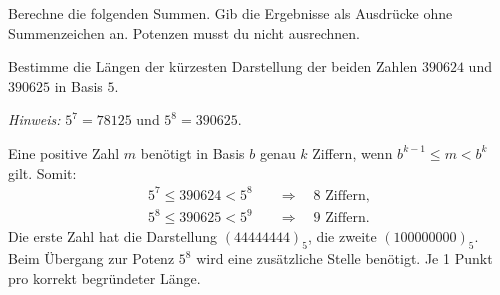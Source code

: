 \begin{questions}
	\question
	Berechne die folgenden Summen. Gib die Ergebnisse als Ausdrücke ohne Summenzeichen an. Potenzen musst du nicht ausrechnen.


	\question[2]
	Bestimme die Längen der kürzesten Darstellung der beiden Zahlen $390624$ und $390625$ in Basis $5$.

	\textit{Hinweis:} $5^7=78125$ und $5^8=390625$.
	\begin{solution}
		Eine positive Zahl $m$ benötigt in Basis $b$ genau $k$ Ziffern, wenn $b^{k-1}\leq m<b^k$ gilt. Somit:
		\begin{align*}
			5^7\leq390624<5^8 &\quad\Longrightarrow\quad 8\text{ Ziffern},\\
			5^8\leq390625<5^9 &\quad\Longrightarrow\quad 9\text{ Ziffern}.
		\end{align*}
		Die erste Zahl hat die Darstellung $(44444444)_5$, die zweite $(100000000)_5$. Beim Übergang zur Potenz $5^8$ wird eine zusätzliche Stelle benötigt. Je 1 Punkt pro korrekt begründeter Länge.
	\end{solution}


\end{questions}
